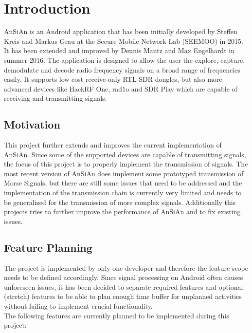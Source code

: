\chapter{Introduction}
	\gls{AnSiAn} is an Android application that has been initially developed by Steffen Kreis and Markus Grau at the Secure Mobile Network Lab (SEEMOO) in 2015. It has been extended and improved by Dennis Mantz and Max Engelhardt in summer 2016. The application is designed to allow the user the explore, capture, demodulate and decode radio frequency signals on a broad range of frequencies easily. It supports low cost receive-only RTL-SDR dongles, but also more advanced devices like HackRF One, rad1o and SDR Play which are capable of receiving and transmitting signals.
	
	
\section{Motivation}
	This project further extends and improves the current implementation of \ac{AnSiAn}. Since some of the supported devices are capable of transmitting signals, the focus of this project is to properly implement the transmission of signals. The most recent version of \ac{AnSiAn} does implement some prototyped transmission of Morse Signals, but there are still some issues that need to be addressed and the implementation of the transmission chain is currently very limited and needs to be generalized for the transmission of more complex signals. Additionally this projects tries to further improve the performance of \ac{AnSiAn} and to fix existing issues. 

\section{Feature Planning}
	The project is implemented by only one developer and therefore the feature scope needs to be defined accordingly. Since signal processing on Android often causes unforeseen issues, it has been decided to separate required features and optional (stretch) features to be able to plan enough time buffer for unplanned activities without failing to implement crucial functionality. \\
	
	The following features are currently planned to be implemented during this project:
	
